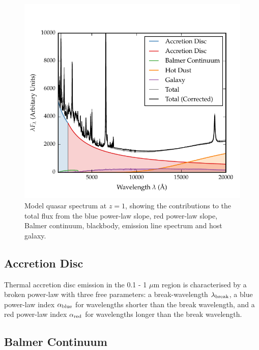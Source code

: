 \begin{figure}
  \centering
  \includegraphics[width=\textwidth]{figures/chapter05/sed_model.pdf}
  \caption[{Model quasar spectrum at $z=1$, showing the contributions to the total flux from the blue power-law slope, red power-law slope, Balmer continuum, blackbody, emission line spectrum and host galaxy.}]{Model quasar spectrum at $z=1$, showing the contributions to the total flux from the blue power-law slope, red power-law slope, Balmer continuum, blackbody, emission line spectrum and host galaxy. }
  \label{fig:modelsed}
\end{figure}


\subsection{Accretion Disc}

Thermal accretion disc emission in the 0.1 - 1 $\mu$m region is characterised by a broken power-law with three free parameters: a break-wavelength $\lambda_{\rm break}$, a blue power-law index $\alpha_{\rm blue}$ for wavelengths shorter than the break wavelength, and a red power-law index $\alpha_{\rm red}$ for wavelengths longer than the break wavelength.

\subsection{Balmer Continuum}

